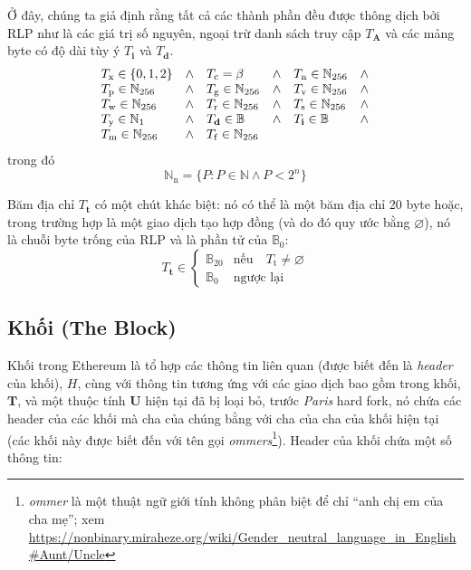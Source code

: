\documentclass[9pt,oneside]{amsart}
\makeatletter
\newcommand{\linkdest}[1]{\Hy@raisedlink{\hypertarget{#1}{}}}
\makeatother
\begin{document}
\begin{multicols}{2}
Ở đây, chúng ta giả định rằng tất cả các thành phần đều được thông dịch bởi RLP như là các giá trị số nguyên, ngoại trừ danh sách truy cập $T_{\mathbf{A}}$ và các mảng byte có độ dài tùy ý $T_{\mathbf{i}}$ và $T_{\mathbf{d}}$.
\begin{equation}
\begin{array}[t]{lclclc}
T_{\mathrm{x}} \in \{0, 1, 2\} & \wedge & T_{\mathrm{c}} = \beta & \wedge & T_{\mathrm{n}} \in \mathbb{N}_{256} & \wedge \\
T_{\mathrm{p}} \in \mathbb{N}_{256} & \wedge & T_{\mathrm{g}} \in \mathbb{N}_{256} & \wedge & T_{\mathrm{v}} \in \mathbb{N}_{256} & \wedge \\
T_{\mathrm{w}} \in \mathbb{N}_{256} & \wedge & T_{\mathrm{r}} \in \mathbb{N}_{256} & \wedge & T_{\mathrm{s}} \in \mathbb{N}_{256} & \wedge \\
T_{\mathrm{y}} \in \mathbb{N}_{1} & \wedge & T_{\mathbf{d}} \in \mathbb{B} & \wedge & T_{\mathbf{i}} \in \mathbb{B} & \wedge \\
T_{\mathrm{m}} \in \mathbb{N}_{256} & \wedge & T_{\mathrm{f}} \in \mathbb{N}_{256}
\end{array}
\end{equation}
trong đó
\begin{equation}
\mathbb{N}_{\mathrm{n}} = \{ P: P \in \mathbb{N} \wedge P < 2^n \}
\end{equation}

Băm địa chỉ $T_{\mathbf{t}}$ có một chút khác biệt: nó có thể là một băm địa chỉ 20 byte hoặc, trong trường hợp là một giao dịch tạo hợp đồng (và do đó quy ước bằng $\varnothing$), nó là chuỗi byte trống của RLP và là phần tử của $\mathbb{B}_0$:
\begin{equation}
T_{\mathbf{t}} \in \begin{cases} \mathbb{B}_{20} & \text{nếu} \quad T_{\mathrm{t}} \neq \varnothing \\
\mathbb{B}_{0} & \text{ngược lại}\end{cases}
\end{equation}

\subsection{Khối (The Block)}\linkdest{block}\label{subsec:The_Block}

Khối trong Ethereum là tổ hợp các thông tin liên quan (được biết đến là \textit{header} của khối), $H$, cùng với thông tin tương ứng với các giao dịch bao gồm trong khối, $\mathbf{T}$,\hypertarget{ommerheaders}{} và một thuộc tính $\mathbf{U}$ hiện tại đã bị loại bỏ, trước \textit{Paris} hard fork, nó chứa các header của các khối mà cha của chúng bằng với cha của cha của khối hiện tại (các khối này được biết đến với tên gọi \textit{ommers}\footnote{\textit{ommer} là một thuật ngữ giới tính không phân biệt để chỉ ``anh chị em của cha mẹ''; xem \url{https://nonbinary.miraheze.org/wiki/Gender_neutral_language_in_English\#Aunt/Uncle}}). Header của khối chứa một số thông tin:


\end{multicols}
\end{document}
